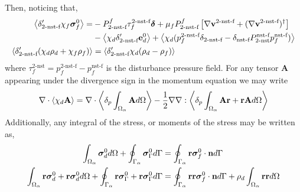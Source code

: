 Then, noticing that, 
\begin{align*}
    \left<\delta_\text{2-nst-f}' \chi_f \bm\sigma_f^0\right>
    =&
    -  P^f_\text{2-nst-f} \tau^\text{2-nst-f}_f \bm\delta
    + \mu_f P^f_\text{2-nst-f} \left[
        \mathbf{\nabla} \textbf{v}^\text{2-nst-f}
        + (\mathbf{\nabla} \textbf{v}^\text{2-nst-f})^\dagger
    \right]\\
    &- \left< \chi_d \delta_\text{2-nst-f}'\textbf{e}_d^0 \right> 
    + \left<\chi_d (p^\text{2-nst-f}_f \delta_\text{2-nst-f} - \delta_\text{nst-f}P_\text{2-nst}^\text{nst-f} p^\text{nst-f}_f )\right>\\
    \left<\delta_\text{2-nst-f}'(\chi_d \rho_d + \chi_f \rho_f)\right>
    &=
    \left<\delta_\text{2-nst-f}'\chi_d (\rho_d - \rho_f)\right>
\end{align*}
where $\tau^\text{2-nst}_f = p_f^\text{2-nst-f} - p_f^\text{nst-f}$ is the disturbance pressure field. 
For any tensor $\textbf{A}$ appearing under the divergence sign in the momentum equation we may write 
\begin{equation}
    \mathbf{\nabla}\cdot\left<\chi_d \textbf{A}\right>
    =
    \mathbf{\nabla}\cdot\left<\delta_p \int_{\Omega_{\alpha}} \textbf{A} d\Omega\right>
    -\frac{1}{2} \mathbf{\nabla}\mathbf{\nabla} : \left<\delta_p \int_{\Omega_{\alpha}} \textbf{Ar}+\textbf{rA} d\Omega\right>
\end{equation}
Additionally, any integral of the stress, or moments of the stress may be written as, 
\begin{align*}
    \int_{\Omega_{\alpha}} 
        \bm\sigma_d^0
     d\Omega
    + 
    \oint_{\Gamma_{\alpha}} 
        \bm\sigma_\Gamma^0
     d\Gamma
    &=
    \oint_{\Gamma_{\alpha}} \textbf{r}\bm\sigma_f^0 \cdot \textbf{n} d\Gamma\\
    \int_{\Omega_{\alpha}} 
        \textbf{r}\bm\sigma_d^0+ \textbf{r}\bm\sigma_d^0
     d\Omega
    + 
    \oint_{\Gamma_{\alpha}} 
        \textbf{r}\bm\sigma_\Gamma^0+\textbf{r}\bm\sigma_\Gamma^0
     d\Gamma
    &=
    \oint_{\Gamma_{\alpha}} \textbf{rr}\bm\sigma_f^0 \cdot \textbf{n} d\Gamma
    + 
    \rho_d \int_{\Omega_{\alpha}} \textbf{rr} d\Omega
\end{align*}

